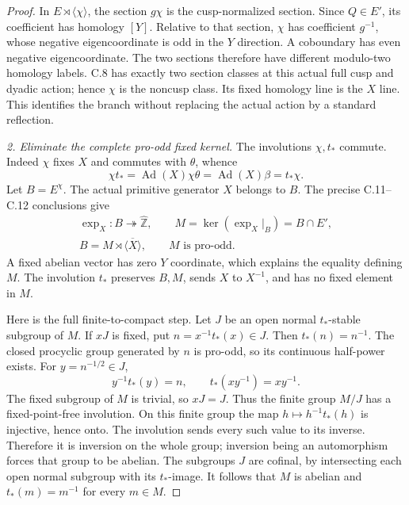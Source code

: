 \begin{proof}
In \(E\rtimes\langle\chi\rangle\), the section \(g\chi\)
is the cusp-normalized section. Since \(Q\in E'\), its coefficient
has homology \([Y]\). Relative to that section, \(\chi\) has
coefficient \(g^{-1}\), whose negative eigencoordinate is odd in
the \(Y\) direction. A coboundary has even negative
eigencoordinate. The two sections therefore have different
modulo-two homology labels. C.8 has exactly two section classes
at this actual full cusp and dyadic action; hence \(\chi\) is
the noncusp class. Its fixed homology line is the \(X\) line.
This identifies the branch without replacing the actual action
by a standard reflection.

\par\smallskip\noindent
\emph{2. Eliminate the complete pro-odd fixed kernel.}
The involutions \(\chi,t_*\) commute. Indeed \(\chi\) fixes
\(X\) and commutes with \(\theta\), whence
\[
 \chi t_*=\operatorname{Ad}(X)\chi\theta
          =\operatorname{Ad}(X)\beta=t_*\chi .
\]
Let \(B=E^\chi\). The actual primitive generator \(X\) belongs
to \(B\). The precise C.11--C.12 conclusions give
\[
\begin{gathered}
 \exp_X:B\twoheadrightarrow\widehat{\mathbb Z},\qquad
 M=\ker(\exp_X|_B)=B\cap E',\\
 B=M\rtimes\overline{\langle X\rangle},\qquad
 M\text{ is pro-odd}.
\end{gathered}
\tag{A.136.5}
\]
A fixed abelian vector has zero \(Y\) coordinate, which explains
the equality defining \(M\). The involution \(t_*\) preserves
\(B,M\), sends \(X\) to \(X^{-1}\), and has no fixed element in
\(M\).

Here is the full finite-to-compact step. Let \(J\) be an open
normal \(t_*\)-stable subgroup of \(M\). If \(xJ\) is fixed,
put \(n=x^{-1}t_*(x)\in J\). Then \(t_*(n)=n^{-1}\).
The closed procyclic group generated by \(n\) is pro-odd,
so its continuous half-power exists. For \(y=n^{-1/2}\in J\),
\[
 y^{-1}t_*(y)=n,\qquad t_*(xy^{-1})=xy^{-1}.
\]
The fixed subgroup of \(M\) is trivial, so \(xJ=J\).
Thus the finite group \(M/J\) has a fixed-point-free involution.
On this finite group the map \(h\mapsto h^{-1}t_*(h)\) is
injective, hence onto. The involution sends every such value to
its inverse. Therefore it is inversion on the whole group;
inversion being an automorphism forces that group to be abelian.
The subgroups \(J\) are cofinal, by intersecting each open normal
subgroup with its \(t_*\)-image. It follows that \(M\) is abelian
and \(t_*(m)=m^{-1}\) for every \(m\in M\).


\end{proof}
